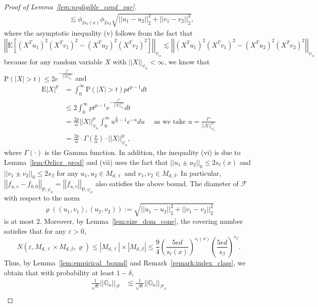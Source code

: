 \documentclass[ejsv2,noshowframe]{imsart}
\theoremstyle{plain}
\theoremstyle{definition}
\theoremstyle{remark}
\newcommand{\norm}[1]{\left|\left| #1 \right|\right|}
\begin{document}
\begin{proof}[Proof of Lemma~\ref{lem:negligible_cond_var}]
\begin{align*}
		&\lesssim \phi_{2s_{\ell}(x)} \phi_{2s_{\beta}} \sqrt{\norm{u_1-u_2}_2^2 + \norm{v_1-v_2}_2^2},
	\end{align*}
	where the asymptotic inequality (v) follows from the fact that
	$$\norm{\mathrm{E}\left[\left(X^Tu_1\right)^2 \left(X^Tv_1\right)^2 - \left(X^Tu_2\right)^2 \left(X^Tv_2\right)^2\right]}_{\psi_{\alpha}} \lesssim \norm{\left(X^Tu_1\right)^2 \left(X^Tv_1\right)^2 - \left(X^Tu_2\right)^2 \left(X^Tv_2\right)^2}_{\psi_{\alpha}}$$
	because for any random variable $X$ with $\norm{X}_{\psi_{\alpha}}<\infty$, we know that $\mathrm{P}\left(|X| > t\right) \leq 2e^{-\frac{t^{\alpha}}{\norm{X}_{\psi_{\alpha}}^{\alpha}}}$ and
	\begin{align*}
		\mathrm{E}|X|^p &= \int_0^{\infty} \mathrm{P}\left(|X| > t\right) pt^{p-1} dt\\
		&\leq 2\int_0^{\infty} pt^{p-1} e^{-\frac{t^{\alpha}}{\norm{X}_{\psi_{\alpha}}^{\alpha}}} dt\\
		&=\frac{2p}{\alpha} \norm{X}_{\psi_{\alpha}}^p\int_0^{\infty} u^{\frac{p}{\alpha}-1} e^{-u}du \quad \text{ as we take } u=\frac{t^{\alpha}}{\norm{X}_{\psi_{\alpha}}^{\alpha}}\\
		&= \frac{2p}{\alpha} \cdot\Gamma\left(\frac{p}{\alpha}\right)\cdot \norm{X}_{\psi_{\alpha}}^p,
	\end{align*}
	where $\Gamma(\cdot)$ is the Gamma function. In addition, the inequality (vi) is due to Lemma~\ref{lem:Orlicz_prod} and (vii) uses the fact that $\norm{u_1\pm u_2}_0\leq 2s_{\ell}(x)$ and $\norm{v_1\pm v_2}_0 \leq 2s_{\beta}$ for any $u_1,u_2 \in M_{d,\ell}$ and $v_1,v_2\in M_{d,\beta}$. In particular, $\norm{f_{u,v}-f_{0,0}}_{\mathrm{P},\psi_{\alpha}} = \norm{f_{u,v}}_{\mathrm{P},\psi_{\alpha}}$ also satisfies the above bound. The diameter of $\mathcal{F}$ with respect to the norm
	$$\varrho\left((u_1,v_1), (u_2,v_2)\right) := \sqrt{\norm{u_1-u_2}_2^2 + \norm{v_1-v_2}_2^2}$$
	is at most 2. Moreover, by Lemma~\ref{lem:size_dom_cone}, the covering number satisfies that for any $\varepsilon>0$,
	$$N\left(\varepsilon, M_{d,\ell}\times M_{d,\beta}, \varrho \right) \leq |M_{d,\ell}| \times |M_{d,\beta}| \leq \frac{9}{4} \left(\frac{5ed}{s_{\ell}(x)}\right)^{s_{\ell}(x)} \left(\frac{5ed}{s_{\beta}}\right)^{s_{\beta}}.$$
	Thus, by Lemma~\ref{lem:empirical_bound} and Remark~\ref{remark:index_class}, we obtain that with probability at least $1-\delta$, 
	\begin{align*}
		\frac{1}{\sqrt{n}} \norm{\mathbb{G}_n}_{\mathcal{F}} & \lesssim \frac{1}{\sqrt{n}} \norm{\mathbb{G}_n}_{\mathcal{F}_{\eta}}\\

\end{align*}
\end{proof}
\end{document}
